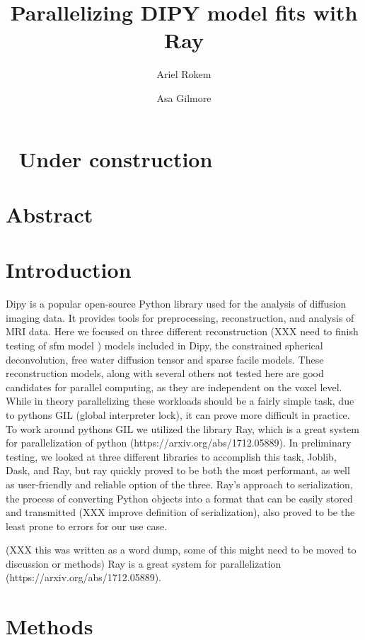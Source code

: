\documentclass[
  letterpaper,
  DIV=11,
  numbers=noendperiod]{scrartcl}
\title{Parallelizing DIPY model fits with Ray}
\author{Ariel Rokem \and Asa Gilmore}
\date{}
\begin{document}
\maketitle

\section{🚧 Under construction 🚧}\label{under-construction}

\section{Abstract}\label{abstract}

\section{Introduction}\label{introduction}

Dipy is a popular open-source Python library used for the analysis of
diffusion imaging data. It provides tools for preprocessing,
reconstruction, and analysis of MRI data. Here we focused on three
different reconstruction (XXX need to finish testing of sfm model )
models included in Dipy, the constrained spherical deconvolution, free
water diffusion tensor and sparse facile models. These reconstruction
models, along with several others not tested here are good candidates
for parallel computing, as they are independent on the voxel level.
While in theory parallelizing these workloads should be a fairly simple
task, due to pythons GIL (global interpreter lock), it can prove more
difficult in practice. To work around pythons GIL we utilized the
library Ray, which is a great system for parallelization of python
(https://arxiv.org/abs/1712.05889). In preliminary testing, we looked at
three different libraries to accomplish this task, Joblib, Dask, and
Ray, but ray quickly proved to be both the most performant, as well as
user-friendly and reliable option of the three. Ray's approach to
serialization, the process of converting Python objects into a format
that can be easily stored and transmitted (XXX improve definition of
serialization), also proved to be the least prone to errors for our use
case.

(XXX this was written as a word dump, some of this might need to be
moved to discussion or methods) Ray is a great system for
parallelization (https://arxiv.org/abs/1712.05889).

\section{Methods}\label{methods}
\end{document}

